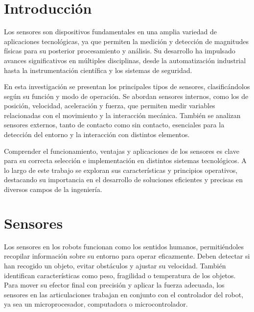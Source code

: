 \section{Introducción}
Los sensores son dispositivos fundamentales en una amplia variedad de aplicaciones tecnológicas, ya que permiten la medición y detección de magnitudes físicas para su posterior procesamiento y análisis. Su desarrollo ha impulsado avances significativos en múltiples disciplinas, desde la automatización industrial hasta la instrumentación científica y los sistemas de seguridad.

En esta investigación se presentan los principales tipos de sensores, clasificándolos según su función y modo de operación. Se abordan sensores internos, como los de posición, velocidad, aceleración y fuerza, que permiten medir variables relacionadas con el movimiento y la interacción mecánica. También se analizan sensores externos, tanto de contacto como sin contacto, esenciales para la detección del entorno y la interacción con distintos elementos.

Comprender el funcionamiento, ventajas y aplicaciones de los sensores es clave para su correcta selección e implementación en distintos sistemas tecnológicos. A lo largo de este trabajo se exploran sus características y principios operativos, destacando su importancia en el desarrollo de soluciones eficientes y precisas en diversos campos de la ingeniería.

\section{Sensores}
Los sensores en los robots funcionan como los sentidos humanos, permitiéndoles recopilar información sobre su entorno para operar eficazmente. Deben detectar si han recogido un objeto, evitar obstáculos y ajustar su velocidad. También identifican características como peso, fragilidad o temperatura de los objetos. Para mover su efector final con precisión y aplicar la fuerza adecuada, los sensores en las articulaciones trabajan en conjunto con el controlador del robot, ya sea un microprocesador, computadora o microcontrolador.